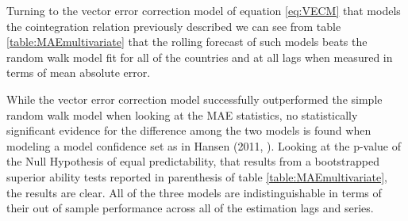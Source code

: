 Turning to the vector error correction model of equation \ref{eq:VECM} that models the cointegration relation previously described we can see from
table \ref{table:MAEmultivariate} that the rolling forecast of such models beats the random walk model fit for all of the countries and at all lags when measured
in terms of mean absolute error. 

While the vector error correction model successfully outperformed the simple random walk model when looking at the MAE statistics, no statistically significant
evidence for the difference among the two models is found when modeling a model confidence set as in Hansen (2011, \cite{HansenMCS}). Looking at the p-value
of the Null Hypothesis of equal predictability, that results from a bootstrapped superior ability tests reported in parenthesis of table \ref{table:MAEmultivariate},
the results are clear. All of the three models are indistinguishable in terms of their out of sample performance across all of the estimation lags and
series.






